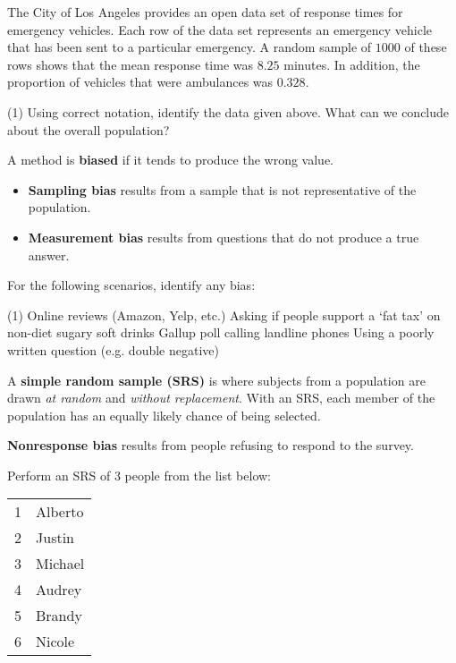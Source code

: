 \documentclass[../mathNotesPreamble]{subfiles}
\begin{document}
  \begin{ex*}
    The City of Los Angeles provides an open data set of response times for emergency vehicles. Each row of the data set represents an emergency vehicle that has been sent to a particular emergency. A random sample of $1000$ of these rows shows that the mean response time was $8.25$ minutes. In addition, the proportion of vehicles that were ambulances was $0.328$.
  \end{ex*}
  \begin{extasks}[after-item-skip=\stretch{1}](1)
    \task Using correct notation, identify the data given above.
    \task What can we conclude about the overall population?
  \end{extasks}
  \pagebreak
  
  \begin{defn*}
    A method is \textbf{biased} if it tends to produce the wrong value.
    \begin{itemize}
      \item \textbf{Sampling bias} results from a sample that is not representative of the population.
      \item \textbf{Measurement bias} results from questions that do not produce a true answer.
    \end{itemize}
  \end{defn*}
  \begin{ex*}
    For the following scenarios, identify any bias:
  \end{ex*}
  \begin{extasks}[after-item-skip=\stretch{1}](1)
    \task Online reviews (Amazon, Yelp, etc.)
    \task Asking if people support a `fat tax' on non-diet sugary soft drinks
    \task Gallup poll calling landline phones
    \task Using a poorly written question (e.g. double negative)
  \end{extasks}
  \pagebreak 

  \begin{defn*}
    A \textbf{simple random sample (SRS)} is where subjects from a population are drawn \emph{at random} and \emph{without replacement}. With an SRS, each member of the population has an equally likely chance of being selected. 

    \textbf{Nonresponse bias} results from people refusing to respond to the survey.
  \end{defn*}
  \begin{ex*}
    Perform an SRS of $3$ people from the list below:
    \begin{center}
      \begin{tabular}{@{}ll@{}}\toprule
        1& Alberto\\ 2& Justin\\3& Michael\\4& Audrey\\5& Brandy\\6& Nicole\\\bottomrule
      \end{tabular}
    \end{center}
  \end{ex*}
  \pagebreak

  \pagebreak
\end{document}
